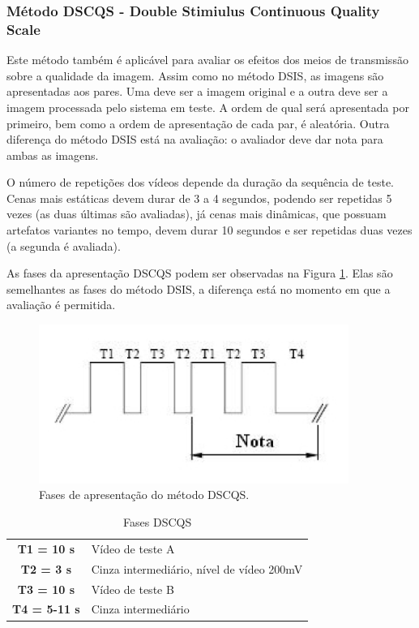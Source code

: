 \subsubsection[Método DSCQS]{Método DSCQS - Double Stimiulus Continuous Quality Scale}

Este método também é aplicável para avaliar os efeitos dos meios de transmissão sobre a qualidade da imagem. Assim como no método DSIS, as imagens são apresentadas aos pares. Uma deve ser a imagem original e a outra deve ser a imagem processada pelo sistema em teste. A ordem de qual será apresentada por primeiro, bem como a ordem de apresentação de cada par, é aleatória. Outra diferença do método DSIS está na avaliação: o avaliador deve dar nota para ambas as imagens.

O número de repetições dos vídeos depende da duração da sequência de teste. Cenas mais estáticas devem durar de 3 a 4 segundos, podendo ser repetidas 5 vezes (as duas últimas são avaliadas), já cenas mais dinâmicas, que possuam artefatos variantes no tempo, devem durar 10 segundos e ser repetidas duas vezes (a segunda é avaliada).

As fases da apresentação DSCQS podem ser observadas na Figura \ref{fig:dscqsfases}. Elas são semelhantes as fases do método DSIS, a diferença está no momento em que a avaliação é permitida. 

\begin{figure}[!htb]
	\centering
	\includegraphics[width=0.9\textwidth]{./imgs/dscqsfases.png}
	\caption{Fases de apresentação do método DSCQS.}
	\label{fig:dscqsfases}
\end{figure}

\begin{table}
	\centering
	\caption{Fases DSCQS}
	\label{tab:dsisfases}
	\begin{tabular}{c|l}
		\hline
		\textbf{T1 = 10 s} & Vídeo de teste A \\
		\textbf{T2 = 3 s} & Cinza intermediário, nível de vídeo 200mV \\
		\textbf{T3 = 10 s} & Vídeo de teste B \\
		\textbf{T4 = 5-11 s} & Cinza intermediário \\
		\hline
	\end{tabular}
\end{table}

